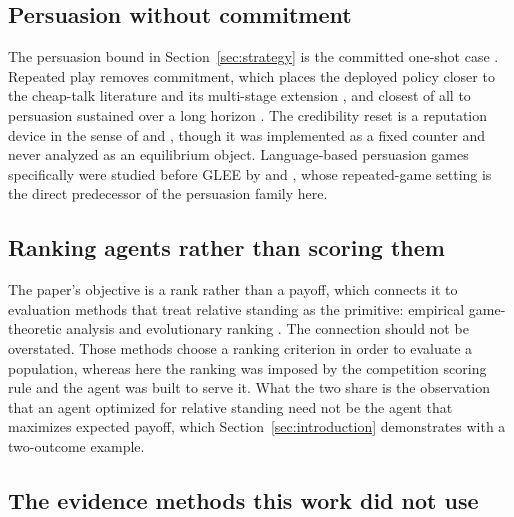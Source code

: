 \subsection{Persuasion without commitment}

The persuasion bound in Section~\ref{sec:strategy} is the committed one-shot
case \citep{kamenica2011bayesian}. Repeated play removes commitment, which
places the deployed policy closer to the cheap-talk literature
\citep{crawford1982strategic,farrell1996cheap} and its multi-stage extension
\citep{aumann2003long}, and closest of all to persuasion sustained over a long
horizon \citep{best2024longrun}. The credibility reset is a reputation device
in the sense of \citet{kreps1982reputation} and \citet{fudenberg1989reputation},
though it was implemented as a fixed counter and never analyzed as an
equilibrium object. Language-based persuasion games specifically were studied
before GLEE by \citet{apel2022predicting} and \citet{raifer2022automatic}, whose
repeated-game setting is the direct predecessor of the persuasion family here.

\subsection{Ranking agents rather than scoring them}

The paper's objective is a rank rather than a payoff, which connects it to
evaluation methods that treat relative standing as the primitive: empirical
game-theoretic analysis \citep{wellman2025egta} and evolutionary ranking
\citep{omidshafiei2019alpharank}. The connection should not be overstated. Those
methods choose a ranking criterion in order to evaluate a population, whereas
here the ranking was imposed by the competition scoring rule and the agent was
built to serve it. What the two share is the observation that an agent optimized
for relative standing need not be the agent that maximizes expected payoff, which
Section~\ref{sec:introduction} demonstrates with a two-outcome example.

\subsection{The evidence methods this work did not use}


